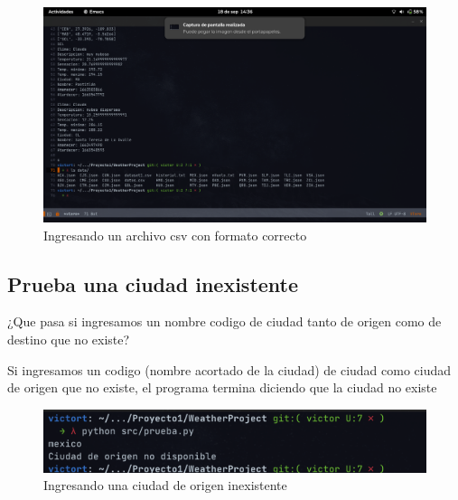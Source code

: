 \documentclass[12pt]{article}
\begin{document}
\begin{figure}[ht]
  \centering
  \includegraphics[scale=0.2]{figures/csv2}
  \caption{Ingresando un archivo csv con formato correcto}
\end{figure}
\newpage
\subsection{Prueba una ciudad inexistente}
¿Que pasa si ingresamos un nombre codigo de ciudad tanto de origen como de destino que no existe?

Si ingresamos un codigo (nombre acortado de la ciudad) de ciudad como ciudad de origen que no existe, el programa termina diciendo que la ciudad no existe
\begin{figure}[h!]
  \centering
  \includegraphics[scale=0.5]{figures/ciudadOmal}
  \caption{Ingresando una ciudad de origen inexistente}
\end{figure}
\end{document}
